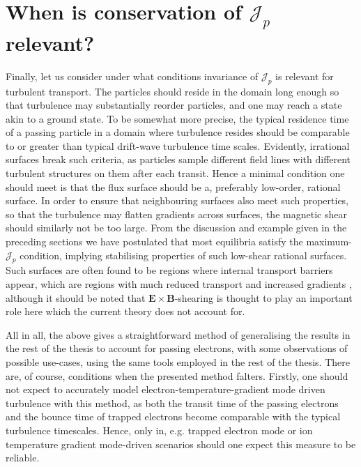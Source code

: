 \section{When is conservation of $\mathcal{J}_p$ relevant?}
Finally, let us consider under what conditions invariance of $\mathcal{J}_p$ is relevant for turbulent transport. The particles should reside in the domain long enough so that turbulence may substantially reorder particles, and one may reach a state akin to a ground state. To be somewhat more precise, the typical residence time of a passing particle in a domain where turbulence resides should be comparable to or greater than typical drift-wave turbulence time scales. Evidently, irrational surfaces break such criteria, as particles sample different field lines with different turbulent structures on them after each transit. Hence a minimal condition one should meet is that the flux surface should be a, preferably low-order, rational surface. In order to ensure that neighbouring surfaces also meet such properties, so that the turbulence may flatten gradients across surfaces, the magnetic shear should similarly not be too large. From the discussion and example given in the preceding sections we have postulated that most equilibria satisfy the maximum-$\mathcal{J}_p$ condition, implying stabilising properties of such low-shear rational surfaces. Such surfaces are often found to be regions where internal transport barriers appear, which are regions with much reduced transport and increased gradients \cite{fujita1997internal,turri2008role,ida2018internal}, although it should be noted that $\boldsymbol{E} \times \boldsymbol{B}$-shearing is thought to play an important role here which the current theory does not account for. \par 
All in all, the above gives a straightforward method of generalising the results in the rest of the thesis to account for passing electrons, with some observations of possible use-cases, using the same tools employed in the rest of the thesis. There are, of course, conditions when the presented method falters. Firstly, one should not expect to accurately model electron-temperature-gradient mode driven turbulence with this method, as both the transit time of the passing electrons and the bounce time of trapped electrons become comparable with the typical turbulence timescales. Hence, only in, e.g. trapped electron mode or ion temperature gradient mode-driven scenarios should one expect this measure to be reliable.
